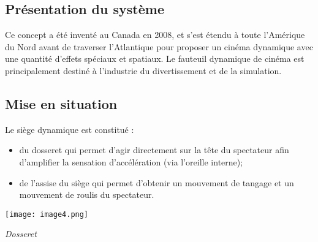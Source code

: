 \ifprof
\else
\begin{multicols}{2}
\fi


\section*{Présentation du système}
\setcounter{numques}{0}
\ifprof
\else
Ce concept a été inventé au Canada en 2008, et s'est étendu à toute l'Amérique du Nord avant de traverser l'Atlantique pour proposer un cinéma dynamique avec une quantité d'effets spéciaux et spatiaux. Le fauteuil dynamique de cinéma est principalement destiné à l'industrie du divertissement et de la simulation.
\fi

\subsection*{Mise en situation}
\ifprof
\else

Le siège dynamique est constitué :
\begin{itemize}
\item du dosseret qui permet d'agir directement sur la tête du spectateur afin d'amplifier la sensation d'accélération (via
l'oreille interne);%
\item de l'assise du siège qui permet d'obtenir un mouvement de tangage et un mouvement de roulis du spectateur.
\end{itemize}

\begin{center}
\texttt{[image: image4.png]}

\textit{Dosseret \label{fig2}}
\end{center}





\end{multicols}
